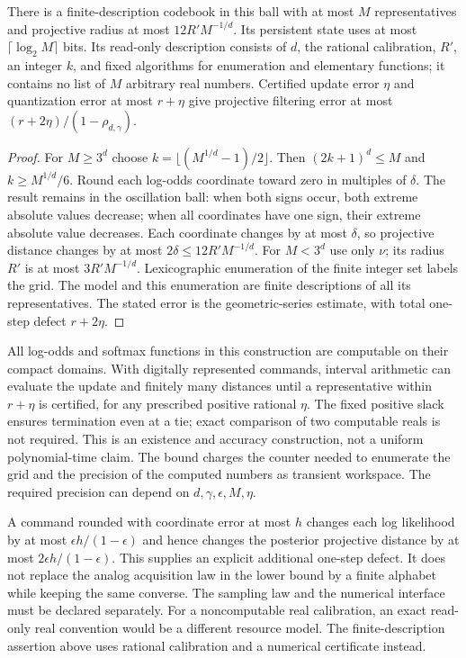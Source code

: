 \begin{proposition}\label{prop:v2-program}
There is a finite-description codebook in this ball with at most $M$
representatives and projective radius at most $12R'M^{-1/d}$. Its
persistent state uses at most $\lceil\log_2M\rceil$ bits. Its read-only
description consists of $d$, the rational calibration, $R'$, an integer
$k$, and fixed algorithms for enumeration and elementary functions; it
contains no list of $M$ arbitrary real numbers. Certified update error
$\eta$ and quantization error at most $r+\eta$ give projective filtering
error at most $(r+2\eta)/(1-\rho_{d,\gamma})$.
\end{proposition}
\begin{proof}
For $M\ge3^d$ choose
$k=\lfloor(M^{1/d}-1)/2\rfloor$. Then $(2k+1)^d\le M$ and
$k\ge M^{1/d}/6$. Round each log-odds coordinate toward zero in
multiples of $\delta$. The result remains in the oscillation ball:
when both signs occur, both extreme absolute values decrease; when all
coordinates have one sign, their extreme absolute value decreases.
Each coordinate changes by at most $\delta$, so projective distance
changes by at most $2\delta\le12R'M^{-1/d}$. For $M<3^d$ use only
$\nu$; its radius $R'$ is at most $3R'M^{-1/d}$.
Lexicographic enumeration of the finite integer set labels the grid.
The model and this enumeration are finite descriptions of all its
representatives. The stated error is the geometric-series estimate,
with total one-step defect $r+2\eta$.
\end{proof}

All log-odds and softmax functions in this construction are computable
on their compact domains. With digitally represented commands, interval
arithmetic can evaluate the update and finitely many distances until a
representative within $r+\eta$ is certified, for any prescribed positive
rational $\eta$. The fixed positive slack ensures termination even at a
tie; exact comparison of two computable reals is not required. This is
an existence and accuracy construction, not a uniform polynomial-time
claim. The bound charges the counter needed to enumerate the grid and
the precision of the computed numbers as transient workspace. The
required precision can depend on $d,\gamma,\epsilon,M,\eta$.

A command rounded with coordinate error at most $h$ changes each log
likelihood by at most $\epsilon h/(1-\epsilon)$ and hence changes the
posterior projective distance by at most
$2\epsilon h/(1-\epsilon)$. This supplies an explicit additional
one-step defect. It does not replace the analog acquisition law in the
lower bound by a finite alphabet while keeping the same converse. The
sampling law and the numerical interface must be declared separately.
For a noncomputable real calibration, an exact read-only real convention
would be a different resource model. The finite-description assertion
above uses rational calibration and a numerical certificate instead.

